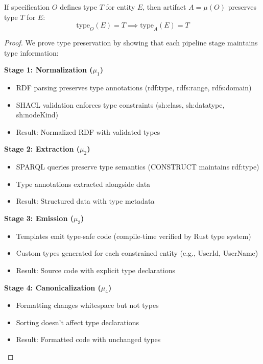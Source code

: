 \begin{theorem}
    If specification \(O\) defines type \(T\) for entity \(E\), then artifact \(A = \mu(O)\) preserves type \(T\) for \(E\):
    \begin{equation}
        \text{type}_O(E) = T \implies \text{type}_A(E) = T
    \end{equation}
\end{theorem}

\begin{proof}
    We prove type preservation by showing that each pipeline stage maintains type information:

    \textbf{Stage 1: Normalization (\(\mu_1\))}
    \begin{itemize}
        \item RDF parsing preserves type annotations (rdf:type, rdfs:range, rdfs:domain)
        \item SHACL validation enforces type constraints (sh:class, sh:datatype, sh:nodeKind)
        \item Result: Normalized RDF with validated types
    \end{itemize}

    \textbf{Stage 2: Extraction (\(\mu_2\))}
    \begin{itemize}
        \item SPARQL queries preserve type semantics (CONSTRUCT maintains rdf:type)
        \item Type annotations extracted alongside data
        \item Result: Structured data with type metadata
    \end{itemize}

    \textbf{Stage 3: Emission (\(\mu_3\))}
    \begin{itemize}
        \item Templates emit type-safe code (compile-time verified by Rust type system)
        \item Custom types generated for each constrained entity (e.g., UserId, UserName)
        \item Result: Source code with explicit type declarations
    \end{itemize}

    \textbf{Stage 4: Canonicalization (\(\mu_4\))}
    \begin{itemize}
        \item Formatting changes whitespace but not types
        \item Sorting doesn't affect type declarations
        \item Result: Formatted code with unchanged types
    \end{itemize}


\end{proof}
